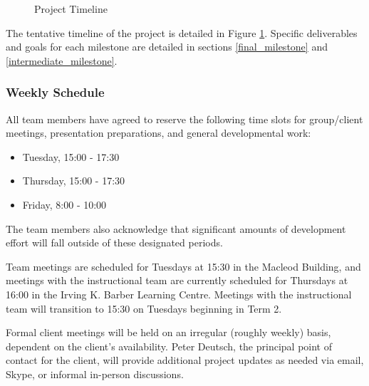 \begin{figure}[H]
       \caption{Project Timeline}\label{fig:timeline}
\end{figure}

The tentative timeline of the project is detailed in Figure \ref{fig:timeline}. Specific deliverables and goals for each milestone are detailed in sections \ref{final_milestone} and \ref{intermediate_milestone}.

\subsubsection{Weekly Schedule}

All team members have agreed to reserve the following time slots for group/client meetings, presentation preparations, and general developmental work:
\begin{itemize}
\item Tuesday, 15:00 - 17:30
\item Thursday, 15:00 - 17:30
\item Friday, 8:00 - 10:00
\end{itemize}

The team members also acknowledge that significant amounts of development effort will fall outside of these designated periods.

Team meetings are scheduled for Tuesdays at 15:30 in the Macleod Building, and meetings with the instructional team are currently scheduled for Thursdays at 16:00 in the Irving K. Barber Learning Centre. Meetings with the instructional team will transition to 15:30 on Tuesdays beginning in Term 2.

Formal client meetings will be held on an irregular (roughly weekly) basis, dependent on the client's availability. Peter Deutsch, the principal point of contact for the client, will provide additional project updates as needed via email, Skype, or informal in-person discussions.
